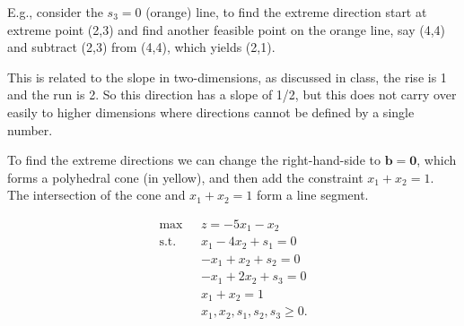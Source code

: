 

\medskip E.g., consider the $s_3=0$ (orange) line, to find the extreme direction start at extreme point (2,3) and find another feasible point on the orange line, say (4,4) and subtract (2,3) from (4,4), which yields (2,1). 

\medskip This is related to the slope in two-dimensions, as discussed in class, the rise is 1 and the run is 2. So this direction has a slope of 1/2, but this does not carry over easily to higher dimensions where directions cannot be defined by a single number. 

\medskip To find the extreme directions we can change the right-hand-side to $\mathbf{b} = \mathbf{0}$, which forms a polyhedral cone (in yellow), and then add the constraint $x_1 + x_2 = 1$. The intersection of the cone and  $x_1 + x_2 = 1$ form a line segment.

\begin{minipage}[t][][b]{.4\linewidth} \vspace{0mm}
\begin{align*}
\mbox{max~~} & z = -5x_1 - x_2  \\
\mbox{s.t.~~} & x_1 - 4x_2 +s_1 = 0  \\
& -x_1 + x_2 + s_2 = 0 \\
& -x_1 + 2x_2 +s_3 = 0 \\
& x_1 + x_2 = 1 \\
& x_1, x_2, s_1, s_2, s_3 \ge 0.
\end{align*}
\end{minipage}%
\begin{minipage}[t][][b]{.6\linewidth}
\begin{center}  \end{center} 
\end{minipage}



